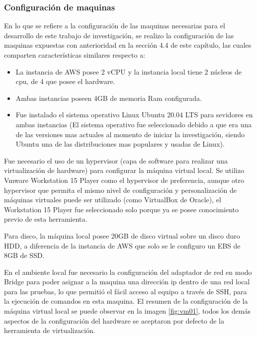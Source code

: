 \subsubsection{Configuración de maquinas}
\par En lo que se refiere a la configuración de las maquinas necesarias para el desarrollo de este trabajo de investigación, se realizo la configuración de las maquinas expuestas con anterioridad en la sección 4.4 de este cap\'itulo, las cuales comparten características similares respecto a:
\begin{itemize}
    \item La instancia de AWS posee 2 vCPU y la instancia local tiene 2 núcleos de cpu, de 4 que posee el hardware.
    \item Ambas instancias poseen 4GB de memoria Ram configurada.
    \item Fue instalado el sistema operativo Linux Ubuntu 20.04 LTS para sevidores en ambas instancias (El sistema operativo fue seleccionado debido a que era una de las versiones mas actuales al momento de iniciar la investigación, siendo Ubuntu una de las distribuciones mas populares y usadas de Linux). 
\end{itemize}
\par Fue necesario el uso de un hypervisor (capa de software para realizar una virtualización de hardware) para configurar la m\'aquina virtual local. Se utilizo Vmware Workstation 15 Player como el hypervisor de preferencia, aunque otro hypervisor que permita el mismo nivel de configuración y personalizaci\'on de máquinas virtuales puede ser utilizado (como VirtualBox de Oracle), el Workstation 15 Player fue seleccionado solo porque  ya se posee conocimiento previo de esta herramienta.\\

\par Para disco, la m\'aquina local posee 20GB de disco virtual sobre un disco duro HDD, a diferencia de la instancia de AWS que solo se le configuro un EBS de 8GB de SSD.\\

\par En el ambiente local fue necesario la configuración del adaptador de red en modo Bridge para poder asignar a la maquina una dirección ip dentro de una red local para las pruebas, lo que permitió el fácil acceso al equipo a través de SSH, para la ejecución de comandos en esta maquina. El resumen de la configuración de la m\'aquina virtual local se puede observar en la imagen \ref{fig:vm01}, todos los demás aspectos de la configuración del hardware se aceptaron por defecto  de la herramienta de virtualizaci\'on.

